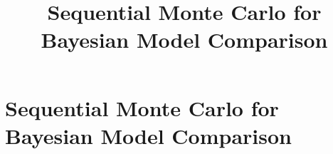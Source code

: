 \ifx\inthesis\undefined %

\title{Sequential Monte Carlo for Bayesian Model Comparison}

\maketitle
\else %
\chapter{Sequential Monte Carlo for Bayesian Model Comparison}
\label{cha:Sequential Monte Carlo for Bayesian Model Comparison}
\fi %


\ifx\inthesis\undefined
\printbibliography
\else\relax\fi
